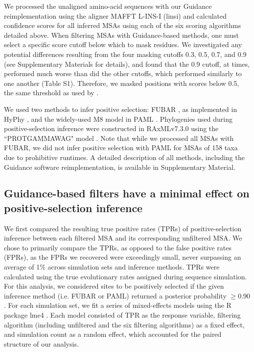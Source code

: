 \documentclass[11pt]{article}
\begin{document}
We processed the unaligned amino-acid sequences with our Guidance reimplementation using the aligner MAFFT L-INS-I (linsi) \citep{Katoh2002,Katoh2005} and calculated confidence scores for all inferred MSAs using each of the six scoring algorithms detailed above. When filtering MSAs with Guidance-based methods, one must select a specific score cutoff below which to mask residues. We investigated any potential differences resulting from the four masking cutoffs 0.3, 0.5, 0.7, and 0.9 (see Supplementary Materials for details), and found that the 0.9 cutoff, at times, performed much worse than did the other cutoffs, which performed similarly to one another (Table S1). Therefore, we masked positions with scores below 0.5, the same threshold as used by \citet{Jordan2012}. 

We used two methods to infer positive selection: FUBAR \citep{Murrell2013}, as implemented in HyPhy \citep{Pond2005}, and the widely-used M8 model in PAML \citep{Yang2000, Yang2007}. Phylogenies used during positive-selection inference were constructed in RAxMLv7.3.0 using the ``PROTGAMMAWAG" model \citep{Stamatakis2006}.  Note that while we processed all MSAs with FUBAR, we did not infer positive selection with PAML for MSAs of 158 taxa due to prohibitive runtimes. A detailed description of all methods, including the Guidance software reimplementation, is available in Supplementary Material.


\subsection*{Guidance-based filters have a minimal effect on positive-selection inference}

We first compared the resulting true positive rates (TPRs) of positive-selection inference between each filtered MSA and its corresponding unfiltered MSA. We chose to primarily compare the TPRs, as opposed to the false positive rates (FPRs), as the FPRs we recovered were exceedingly small, never surpassing an average of 1\% across simulation sets and inference methods. TPRs were calculated using the true evolutionary rates assigned during sequence simulation. For this analysis, we considered sites to be positively selected if the given inference method (i.e. FUBAR or PAML) returned a posterior probability $\geq0.90$. For each simulation set, we fit a series of mixed-effects models using the R package lme4 \citep{Bates2012}. Each model consisted of TPR as the response variable, filtering algorithm (including unfiltered and the six filtering algorithms) as a fixed effect, and simulation count as a random effect, which accounted for the paired structure of our analysis. 
\end{document}
